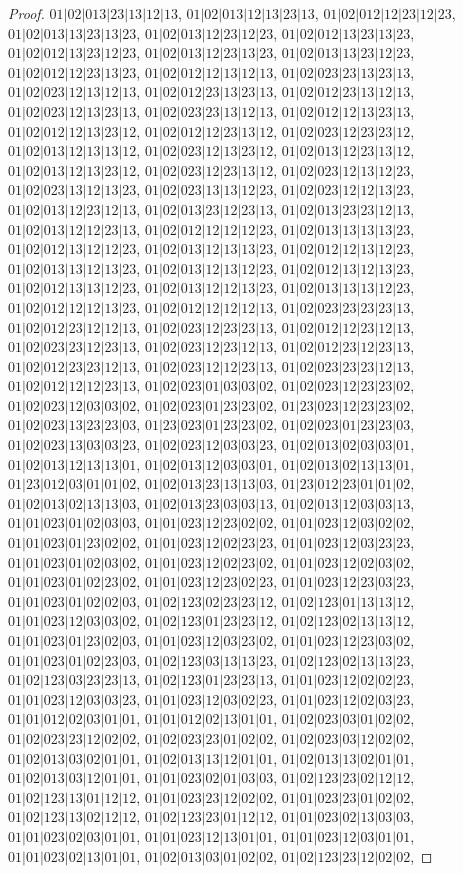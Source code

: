 \documentclass[12pt]{article}
\theoremstyle{plain}
\theoremstyle{definition}
\theoremstyle{remark}
\begin{document}
\begin{proof}
$01|02|013|23|13|12|13$, $01|02|013|12|13|23|13$, $01|02|012|12|23|12|23$, $01|02|013|13|23|13|23$, $01|02|013|12|23|12|23$, $01|02|012|13|23|13|23$, $01|02|012|13|23|12|23$, $01|02|013|12|23|13|23$, $01|02|013|13|23|12|23$, $01|02|012|12|23|13|23$, $01|02|012|12|13|12|13$, $01|02|023|23|13|23|13$, $01|02|023|12|13|12|13$, $01|02|012|23|13|23|13$, $01|02|012|23|13|12|13$, $01|02|023|12|13|23|13$, $01|02|023|23|13|12|13$, $01|02|012|12|13|23|13$, $01|02|012|12|13|23|12$, $01|02|012|12|23|13|12$, $01|02|023|12|23|23|12$, $01|02|013|12|13|13|12$, $01|02|023|12|13|23|12$, $01|02|013|12|23|13|12$, $01|02|013|12|13|23|12$, $01|02|023|12|23|13|12$, $01|02|023|12|13|12|23$, $01|02|023|13|12|13|23$, $01|02|023|13|13|12|23$, $01|02|023|12|12|13|23$, $01|02|013|12|23|12|13$, $01|02|013|23|12|23|13$, $01|02|013|23|23|12|13$, $01|02|013|12|12|23|13$, $01|02|012|12|12|12|23$, $01|02|013|13|13|13|23$, $01|02|012|13|12|12|23$, $01|02|013|12|13|13|23$, $01|02|012|12|13|12|23$, $01|02|013|13|12|13|23$, $01|02|013|12|13|12|23$, $01|02|012|13|12|13|23$, $01|02|012|13|13|12|23$, $01|02|013|12|12|13|23$, $01|02|013|13|13|12|23$, $01|02|012|12|12|13|23$, $01|02|012|12|12|12|13$, $01|02|023|23|23|23|13$, $01|02|012|23|12|12|13$, $01|02|023|12|23|23|13$, $01|02|012|12|23|12|13$, $01|02|023|23|12|23|13$, $01|02|023|12|23|12|13$, $01|02|012|23|12|23|13$, $01|02|012|23|23|12|13$, $01|02|023|12|12|23|13$, $01|02|023|23|23|12|13$, $01|02|012|12|12|23|13$, $01|02|023|01|03|03|02$, $01|02|023|12|23|23|02$, $01|02|023|12|03|03|02$, $01|02|023|01|23|23|02$, $01|23|023|12|23|23|02$, $01|02|023|13|23|23|03$, $01|23|023|01|23|23|02$, $01|02|023|01|23|23|03$, $01|02|023|13|03|03|23$, $01|02|023|12|03|03|23$, $01|02|013|02|03|03|01$, $01|02|013|12|13|13|01$, $01|02|013|12|03|03|01$, $01|02|013|02|13|13|01$, $01|23|012|03|01|01|02$, $01|02|013|23|13|13|03$, $01|23|012|23|01|01|02$, $01|02|013|02|13|13|03$, $01|02|013|23|03|03|13$, $01|02|013|12|03|03|13$, $01|01|023|01|02|03|03$, $01|01|023|12|23|02|02$, $01|01|023|12|03|02|02$, $01|01|023|01|23|02|02$, $01|01|023|12|02|23|23$, $01|01|023|12|03|23|23$, $01|01|023|01|02|03|02$, $01|01|023|12|02|23|02$, $01|01|023|12|02|03|02$, $01|01|023|01|02|23|02$, $01|01|023|12|23|02|23$, $01|01|023|12|23|03|23$, $01|01|023|01|02|02|03$, $01|02|123|02|23|23|12$, $01|02|123|01|13|13|12$, $01|01|023|12|03|03|02$, $01|02|123|01|23|23|12$, $01|02|123|02|13|13|12$, $01|01|023|01|23|02|03$, $01|01|023|12|03|23|02$, $01|01|023|12|23|03|02$, $01|01|023|01|02|23|03$, $01|02|123|03|13|13|23$, $01|02|123|02|13|13|23$, $01|02|123|03|23|23|13$, $01|02|123|01|23|23|13$, $01|01|023|12|02|02|23$, $01|01|023|12|03|03|23$, $01|01|023|12|03|02|23$, $01|01|023|12|02|03|23$, $01|01|012|02|03|01|01$, $01|01|012|02|13|01|01$, $01|02|023|03|01|02|02$, $01|02|023|23|12|02|02$, $01|02|023|23|01|02|02$, $01|02|023|03|12|02|02$, $01|02|013|03|02|01|01$, $01|02|013|13|12|01|01$, $01|02|013|13|02|01|01$, $01|02|013|03|12|01|01$, $01|01|023|02|01|03|03$, $01|02|123|23|02|12|12$, $01|02|123|13|01|12|12$, $01|01|023|23|12|02|02$, $01|01|023|23|01|02|02$, $01|02|123|13|02|12|12$, $01|02|123|23|01|12|12$, $01|01|023|02|13|03|03$, $01|01|023|02|03|01|01$, $01|01|023|12|13|01|01$, $01|01|023|12|03|01|01$, $01|01|023|02|13|01|01$, $01|02|013|03|01|02|02$, $01|02|123|23|12|02|02$, 
\end{proof}
\end{document}
